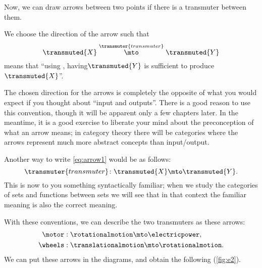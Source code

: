 Now, we can draw arrows between two points if there is a transmuter between them.

We choose the direction of the arrow such that
\begin{equation}
  \label{eq:arrow1}
  \transmuted{X} \stackrel{\transmuter{transmuter}}{\mto} \transmuted{Y}
\end{equation}
means that ``using , having$\transmuted{Y}$ is sufficient to produce~$\transmuted{X}$''.

\begin{remark}
  The chosen direction
  for the arrows is completely the opposite of what you would expect if you thought about
  ``input and outputs''. There is a good reason to use this convention, though it will
  be apparent only a few chapters later. In the meantime, it is a good exercise
  to liberate your mind about the preconception of what an arrow means; in category theory
  there will be categories where the arrows represent much more abstract concepts than input/output.
\end{remark}

Another way to write \cref{eq:arrow1} would be as follows:
\begin{equation}
  \transmuter{transmuter} \colon \transmuted{X} \mto \transmuted{Y}.
\end{equation}
This is now to you something syntactically familiar; when we study the categories of sets and functions between sets we will see that in that context the familiar meaning is also the correct meaning.

With these conventions, we can describe the two transmuters as these arrows:
%
\begin{equation}
  \label{eq:transmutation_example}
\begin{aligned}
  \motor&:  \rotationalmotion \mto \electricpower, \\
  \wheels&: \translationalmotion \mto \rotationalmotion.
\end{aligned}
\end{equation}
%
We can put these arrows in the diagrams, and obtain
the following (\cref{fig:e2}).





